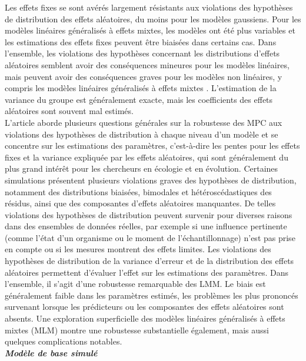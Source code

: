 \documentclass{article}
\begin{document}
Les effets fixes se sont avérés largement résistants aux violations des hypothèses de distribution des effets aléatoires, du moins pour les modèles gaussiens. Pour les modèles linéaires généralisés à effets mixtes, les modèles ont été plus variables et les estimations des effets fixes peuvent être biaisées dans certains cas. Dans l'ensemble, les violations des hypothèses concernant les distributions d'effets aléatoires semblent avoir des conséquences mineures pour les modèles linéaires, mais peuvent avoir des conséquences graves pour les modèles non linéaires, y compris les modèles linéaires généralisés à effets mixtes . L'estimation de la variance du groupe est généralement exacte, mais les coefficients des effets aléatoires  sont souvent mal estimés. \\
L’article aborde plusieurs questions générales sur la robustesse des MPC aux violations des hypothèses de distribution à chaque niveau d'un modèle et se concentre sur les estimations des paramètres, c'est-à-dire les pentes pour les effets fixes et la variance expliquée par les effets aléatoires, qui sont généralement du plus grand intérêt pour les chercheurs en écologie et en évolution. Certaines simulations présentent plusieurs violations graves des hypothèses de distribution, notamment des distributions biaisées, bimodales et hétéroscédastiques des résidus, ainsi que des composantes d'effets aléatoires manquantes. De telles violations des hypothèses de distribution peuvent survenir pour diverses raisons dans des ensembles de données réelles, par exemple si une influence pertinente (comme l'état d'un organisme ou le moment de l'échantillonnage) n'est pas prise en compte ou si les mesures montrent des effets limites. Les violations des hypothèses de distribution de la variance d'erreur et de la distribution des effets aléatoires permettent d’évaluer l'effet sur les estimations des paramètres. Dans l'ensemble, il s’agit d’une robustesse remarquable des LMM. Le biais est généralement faible dans les paramètres estimés, les problèmes les plus prononcés survenant lorsque les prédicteurs ou les composantes des effets aléatoires sont absents. Une exploration superficielle des modèles linéaires généralisés à effets mixtes (MLM) montre une robustesse substantielle également, mais aussi quelques complications notables. \\ 







\textbf{\textit{Modèle de base simulé}}\\
\end{document}
